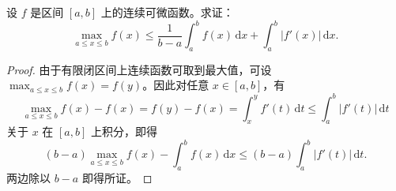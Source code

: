 \documentclass[../../main.tex]{subfiles}
\begin{document}
\begin{example}
设 \( f \) 是区间 \([a,b]\) 上的连续可微函数。求证：
\[
\max_{a\leqslant x\leqslant b} f(x)\leqslant \frac{1}{b-a}\int_a^b{f(x)\,\mathrm{d}x}+\int_a^b{|f' (x)|\,\mathrm{d}x}.
\]
\end{example}
\begin{proof}
由于有限闭区间上连续函数可取到最大值，可设 \( \max_{a \leqslant x \leqslant b} f(x) = f(y) \)。因此对任意 \( x \in [a,b] \)，有
\[
\max_{a \leqslant x \leqslant b} f(x) - f(x) = f(y) - f(x) = \int_{x}^{y} f'(t) \, \mathrm{d}t \leqslant \int_{a}^{b} |f'(t)| \, \mathrm{d}t
\]
关于 \( x \) 在 \([a,b]\) 上积分，即得
\[
(b - a) \max_{a \leqslant x \leqslant b} f(x) - \int_{a}^{b} f(x) \, \mathrm{d}x \leqslant (b-a)\int_{a}^{b} |f'(t)| \, \mathrm{d}t.
\]
两边除以 \( b - a \) 即得所证。
\end{proof}
\end{document}
